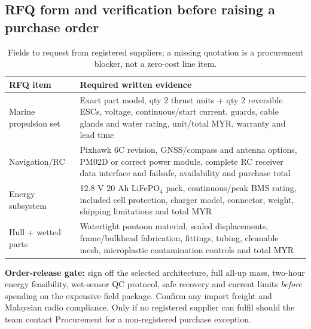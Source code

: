 \documentclass[10pt,a4paper]{article}
\begin{document}
\subsection{RFQ form and verification before raising a purchase order}
\begin{table}[H]\centering\footnotesize
\caption{Fields to request from registered suppliers; a missing quotation is a procurement blocker, not a zero-cost line item.}
\begin{tabularx}{\linewidth}{@{}L{3.6cm}Y@{}}\toprule
RFQ item & Required written evidence \\\midrule
Marine propulsion set & Exact part model, qty 2 thrust units + qty 2 reversible ESCs, voltage, continuous/start current, guards, cable glands and water rating, unit/total MYR, warranty and lead time\\
Navigation/RC & Pixhawk 6C revision, GNSS/compass and antenna options, PM02D or correct power module, complete RC receiver data interface and failsafe, availability and purchase total\\
Energy subsystem & 12.8 V 20 Ah LiFePO$_4$ pack, continuous/peak BMS rating, included cell protection, charger model, connector, weight, shipping limitations and total MYR\\
Hull + wetted parts & Watertight pontoon material, sealed displacements, frame/bulkhead fabrication, fittings, tubing, cleanable mesh, microplastic contamination controls and total MYR\\
\bottomrule\end{tabularx}\end{table}

\textbf{Order-release gate:} sign off the selected architecture, full all-up mass, two-hour energy feasibility, wet-sensor QC protocol, safe recovery and current limits \emph{before} spending on the expensive field package. Confirm any import freight and Malaysian radio compliance. Only if no registered supplier can fulfil should the team contact Procurement for a non-registered purchase exception.
\end{document}

